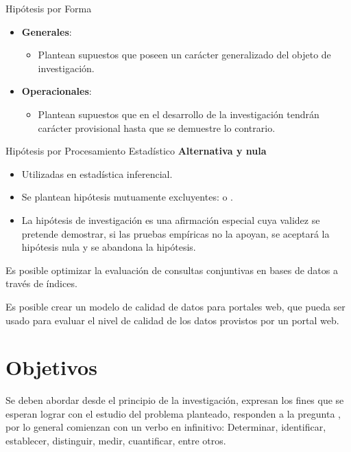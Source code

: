 Hipótesis por Forma
\begin{itemize}
  \item \textbf{Generales}:
  \begin{itemize}
  \item Plantean supuestos que poseen un carácter generalizado del objeto de investigación.
\end{itemize}

  \item \textbf{Operacionales}:
  \begin{itemize}
  \item Plantean supuestos que en el desarrollo de la investigación tendrán carácter provisional hasta que se demuestre lo contrario.
\end{itemize}

\end{itemize}

Hipótesis por Procesamiento Estadístico
\textbf{Alternativa y nula}
 \begin{itemize}\justifying
  \item Utilizadas en estadística inferencial.
  \item Se plantean hipótesis mutuamente excluyentes:  o .
  \item La hipótesis de investigación es una afirmación especial cuya validez se pretende demostrar, si las pruebas empíricas no la apoyan, se aceptará la hipótesis nula y se abandona la hipótesis.
\end{itemize}

\begin{ejemplo}
  Es posible optimizar la evaluación de consultas conjuntivas en bases de datos a través de índices.
\end{ejemplo}

\begin{ejemplo}
  Es posible crear un modelo de calidad de datos para portales web, que pueda ser usado para evaluar el nivel de calidad de los datos provistos por un portal web.
\end{ejemplo}

\section{Objetivos}\label{objetivos}

Se deben abordar desde el principio de la investigación, expresan los fines que se esperan lograr con el estudio del problema planteado, responden a la pregunta , por lo general comienzan con un verbo en infinitivo: Determinar, identificar, establecer, distinguir, medir, cuantificar, entre otros.


